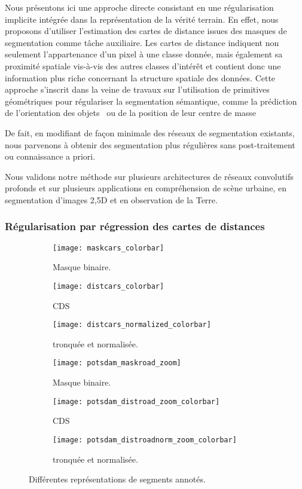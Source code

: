 Nous présentons ici une approche directe consistant en une régularisation implicite intégrée dans la représentation de la vérité terrain. En effet, nous proposons d'utiliser l'estimation  des cartes de distance issues des masques de segmentation comme tâche auxiliaire. Les cartes de distance indiquent non seulement l'appartenance d'un pixel à une classe donnée, mais également sa proximité spatiale vis-à-vis des autres classes d'intérêt et contient donc une information plus riche concernant la structure spatiale des données. Cette approche s'inscrit dans la veine de travaux sur l'utilisation de primitives géométriques pour régulariser la segmentation sémantique, comme la prédiction de l'orientation des objets~\cite{uhrig_pixel-level_2016} ou de la position de leur centre de masse~\cite{hayder_boundary-aware_2017}

De fait, en modifiant de façon minimale des réseaux de segmentation existants, nous parvenons à obtenir des segmentation plus régulières sans post-traitement ou connaissance a priori.

Nous validons notre méthode sur plusieurs architectures de réseaux convolutifs profonds et sur plusieurs applications en compréhension de scène urbaine, en segmentation d'images 2,5D et en observation de la Terre.

\subsubsection{Régularisation par régression des cartes de distances}
\begin{figure}[!t]
    \begin{subfigure}{0.33\textwidth}
    	\texttt{[image: maskcars\_colorbar]}
        \caption{Masque binaire.}
    \end{subfigure}
    \begin{subfigure}{0.33\textwidth}
    	\texttt{[image: distcars\_colorbar]}
        \caption{\Glsdesc{CDS}}
    \end{subfigure}
    \begin{subfigure}{0.33\textwidth}
    	\texttt{[image: distcars\_normalized\_colorbar]}
        \caption{ tronquée et normalisée.}
    \end{subfigure}

	\begin{subfigure}{0.33\textwidth}
    	\texttt{[image: potsdam\_maskroad\_zoom]}
        \caption{Masque binaire.}
    \end{subfigure}
    \begin{subfigure}{0.33\textwidth}
    	\texttt{[image: potsdam\_distroad\_zoom\_colorbar]}
        \caption{\Glsdesc{CDS}}
    \end{subfigure}
    \begin{subfigure}{0.33\textwidth}
    	\texttt{[image: potsdam\_distroadnorm\_zoom\_colorbar]}
        \caption{ tronquée et normalisée.}
    \end{subfigure}
    \caption{Différentes représentations de segments annotés.}
    \label{fig:representations}
\end{figure}

